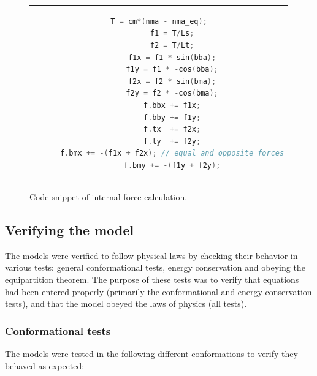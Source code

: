 \documentclass[10pt]{article} %
\begin{document}
\begin{figure}[h]
  \centering
  \begin{tabular}{c}
    \begin{lstlisting}[language=C++]
      T = cm*(nma - nma_eq);
      f1 = T/Ls;
      f2 = T/Lt;
      f1x = f1 * sin(bba);
      f1y = f1 * -cos(bba);
      f2x = f2 * sin(bma);
      f2y = f2 * -cos(bma);
      f.bbx += f1x;
      f.bby += f1y;
      f.tx  += f2x;
      f.ty  += f2y;
      f.bmx += -(f1x + f2x); // equal and opposite forces
      f.bmy += -(f1y + f2y);
    \end{lstlisting}
  \end{tabular}
  \caption{Code snippet of internal force calculation.}
  \label{transition-rate-snippet}
\end{figure}

\subsection{Verifying the model}
The models were verified to follow physical laws by checking their behavior in various tests: general conformational tests, energy conservation and obeying the equipartition theorem. The purpose of these tests was to verify that equations had been entered properly (primarily the conformational and energy conservation tests), and that the model obeyed the laws of physics (all tests).

\subsubsection{Conformational tests}
The models were tested in the following different conformations to verify they behaved as expected:\\
\end{document}
